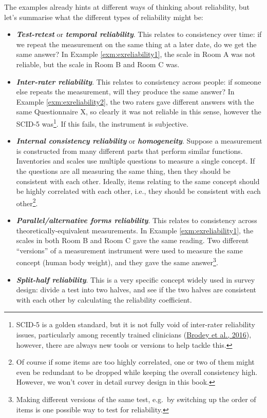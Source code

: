 \documentclass[
  11pt,
]{book}
\providecommand{\tightlist}{%
  \setlength{\itemsep}{0pt}\setlength{\parskip}{0pt}}
\theoremstyle{definition}
\theoremstyle{definition}
\theoremstyle{definition}
\theoremstyle{definition}
\theoremstyle{remark}
\begin{document}
The examples already hints at different ways of thinking about reliability, but let's summarise what the different types of reliability might be:

\begin{itemize}
\tightlist
\item
  \textbf{\emph{Test-retest}} or \textbf{\emph{temporal reliability}}. This relates to consistency over time: if we repeat the measurement on the same thing at a later date, do we get the same answer? In Example \ref{exm:exreliability1}, the scale in Room A was not reliable, but the scale in Room B and Room C was.
\item
  \textbf{\emph{Inter-rater reliability}}. This relates to consistency across people: if someone else repeats the measurement, will they produce the same answer? In Example \ref{exm:exreliability2}, the two raters gave different answers with the same Questionnaire X, so clearly it was not reliable in this sense, however the SCID-5 was\footnote{SCID-5 is a golden standard, but it is not fully void of inter-rater reliability issues, particularly among recently trained clinicians (\protect\hyperlink{ref-brodeyValidationNetSCIDAutomated2016}{Brodey et al., 2016}), however, there are always new tools or versions to help tackle this.}. If this fails, the instrument is subjective.
\item
  \textbf{\emph{Internal consistency reliability}} or \textbf{\emph{homogeneity}}. Suppose a measurement is constructed from many different parts that perform similar functions. Inventories and scales use multiple questions to measure a single concept. If the questions are all measuring the same thing, then they should be consistent with each other. Ideally, items relating to the same concept should be highly correlated with each other, i.e., they should be consistent with each other\footnote{Of course if some items are too highly correlated, one or two of them might even be redundant to be dropped while keeping the overall consistency high. However, we won't cover in detail survey design in this book.}.
\item
  \textbf{\emph{Parallel/alternative forms reliability}}. This relates to consistency across theoretically-equivalent measurements. In Example \ref{exm:exreliability1}, the scales in both Room B and Room C gave the same reading. Two different ``versions'' of a measurement instrument were used to measure the same concept (human body weight), and they gave the same answer\footnote{Making different versions of the same test, e.g.~by switching up the order of items is one possible way to test for reliability.}.
\item
  \textbf{\emph{Split-half reliability}}. This is a very specific concept widely used in survey design: divide a test into two halves, and see if the two halves are consistent with each other by calculating the reliability coefficient.
\end{itemize}
\end{document}
